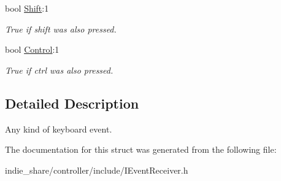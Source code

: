 \begin{DoxyCompactItemize}
bool \hyperlink{structirr_1_1SEvent_1_1SKeyInput_a54b1c282890d6f6da7ba2f73d795d45a}{Shift}\+:1
\begin{DoxyCompactList}\small\item\em True if shift was also pressed. \end{DoxyCompactList}\item 
\mbox{\label{structirr_1_1SEvent_1_1SKeyInput_a4f8138bfd7842939bde07e7d63bc7434}} 
bool \hyperlink{structirr_1_1SEvent_1_1SKeyInput_a4f8138bfd7842939bde07e7d63bc7434}{Control}\+:1
\begin{DoxyCompactList}\small\item\em True if ctrl was also pressed. \end{DoxyCompactList}\end{DoxyCompactItemize}


\subsection{Detailed Description}
Any kind of keyboard event. 

The documentation for this struct was generated from the following file\+:\begin{DoxyCompactItemize}
\item 
indie\+\_\+share/controller/include/I\+Event\+Receiver.\+h\end{DoxyCompactItemize}
